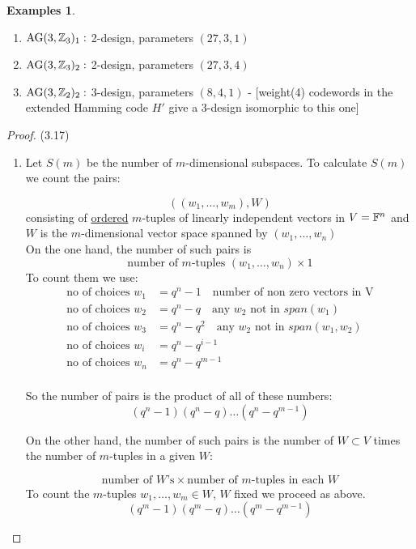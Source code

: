 \documentclass[]{article}
\theoremstyle{definition}
\newtheorem*{exmps}{Examples}
\theoremstyle{remark}
\numberwithin{equation}{section}
\begin{document}
			\begin{exmps}\hfill
				\begin{enumerate}
					\item $\text{AG}(3, \mathbb{Z}_3)_1:$ 2-design, parameters $(27, 3, 1)$
					\item $\text{AG}(3, \mathbb{Z}_3)_2:$ 2-design, parameters $(27,3, 4)$
					\item $\text{AG}(3, \mathbb{Z}_2)_2:$ 3-design, parameters $(8, 4, 1)$ - [weight(4) codewords in the extended Hamming code $H'$ give a 3-design isomorphic to this one]
				\end{enumerate}
			\end{exmps}


			\begin{proof}(3.17)
				\begin{enumerate}
					\item Let $S(m)$ be the number of $m$-dimensional subspaces. To calculate $S(m)$ we count the pairs:

					\[
						\left( (w_1, \hdots, w_m), W\right)
					\]
					consisting of \underline{ordered} $m$-tuples of linearly independent vectors in $V= \mathbb F^n$ and $W$ is the $m$-dimensional vector space spanned by $(w_1, \hdots, w_n)$
					\\
					On the one hand, the number of such pairs is
					\[
						\text{number of $m$-tuples $(w_1, \hdots, w_n)$} \times 1
					\]
					To count them we use:
					\begin{align*}
						\text{no of choices $w_1$} &= q^n - 1\quad \text{number of non zero vectors in V} \\
						\text{no of choices $w_2$} &= q^n - q \quad \text{any $w_2$ not in $span(w_1)$}\\
						\text{no of choices $w_3$} &= q^n - q^2 \quad \text{any $w_2$ not in $span(w_1, w_2)$}\\
						\text{no of choices $w_i$} &= q^n - q^{i-1} \\
						\text{no of choices $w_n$} &= q^n - q^{m-1} \\
					\end{align*}

					So the number of pairs is the product of all of these numbers:
						\[
							(q^n -1)(q^n -q) \hdots (q^n - q^{m-1})
						\]

					On the other hand, the number of such pairs is the number of $W \subset V$ times the number of $m$-tuples in a given $W$:

					\[
						\text{number of $W$'s} \times \text{number of $m$-tuples in each $W$}
					\]
					To count the $m$-tuples $w_1, \hdots, w_m \in W$, $W$ fixed we proceed as above.
					\[
						(q^m -1)(q^m - q)\hdots (q^m - q^{m-1})
					\]


\end{enumerate}
\end{proof}
\end{document}
